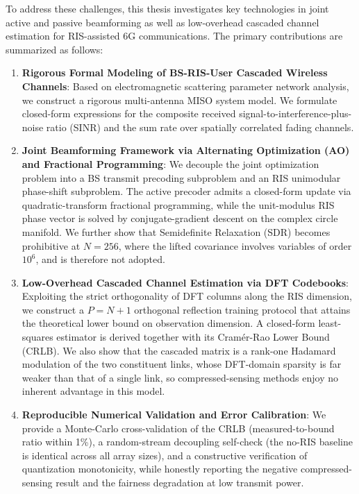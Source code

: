 \documentclass[12pt,a4paper,openany,UTF8]{ctexrep}
\begin{document}
To address these challenges, this thesis investigates key technologies in joint active and passive beamforming as well as low-overhead cascaded channel estimation for RIS-assisted 6G communications. The primary contributions are summarized as follows:
\begin{enumerate}
  \item \textbf{Rigorous Formal Modeling of BS-RIS-User Cascaded Wireless Channels}: Based on electromagnetic scattering parameter network analysis, we construct a rigorous multi-antenna MISO system model. We formulate closed-form expressions for the composite received signal-to-interference-plus-noise ratio (SINR) and the sum rate over spatially correlated fading channels.
  \item \textbf{Joint Beamforming Framework via Alternating Optimization (AO) and Fractional Programming}: We decouple the joint optimization problem into a BS transmit precoding subproblem and an RIS unimodular phase-shift subproblem. The active precoder admits a closed-form update via quadratic-transform fractional programming, while the unit-modulus RIS phase vector is solved by conjugate-gradient descent on the complex circle manifold. We further show that Semidefinite Relaxation (SDR) becomes prohibitive at $N = 256$, where the lifted covariance involves variables of order $10^6$, and is therefore not adopted.
  \item \textbf{Low-Overhead Cascaded Channel Estimation via DFT Codebooks}: Exploiting the strict orthogonality of DFT columns along the RIS dimension, we construct a $P = N+1$ orthogonal reflection training protocol that attains the theoretical lower bound on observation dimension. A closed-form least-squares estimator is derived together with its Cramér-Rao Lower Bound (CRLB). We also show that the cascaded matrix is a rank-one Hadamard modulation of the two constituent links, whose DFT-domain sparsity is far weaker than that of a single link, so compressed-sensing methods enjoy no inherent advantage in this model.
  \item \textbf{Reproducible Numerical Validation and Error Calibration}: We provide a Monte-Carlo cross-validation of the CRLB (measured-to-bound ratio within 1\%), a random-stream decoupling self-check (the no-RIS baseline is identical across all array sizes), and a constructive verification of quantization monotonicity, while honestly reporting the negative compressed-sensing result and the fairness degradation at low transmit power.
\end{enumerate}
\end{document}
